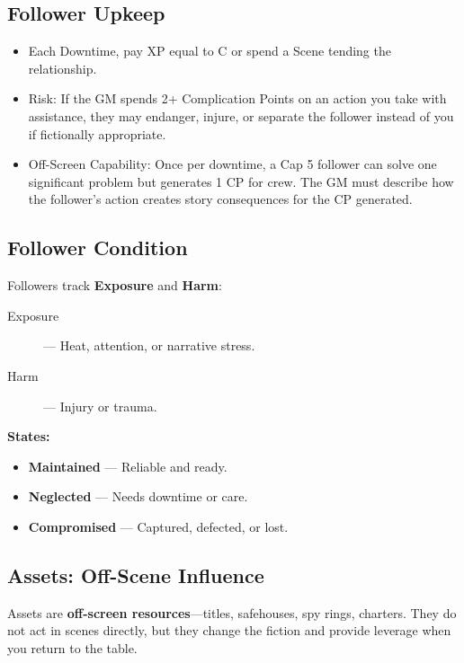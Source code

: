 \subsection*{Follower Upkeep}

\begin{itemize}
    \item Each Downtime, pay XP equal to C or spend a Scene tending the relationship.
    \item Risk: If the GM spends 2+ Complication Points on an action you take with assistance, they may endanger, injure, or separate the follower instead of you if fictionally appropriate.
    \item Off-Screen Capability: Once per downtime, a Cap 5 follower can solve one significant problem but generates 1 CP for crew. The GM must describe how the follower's action creates story consequences for the CP generated.
\end{itemize}

\subsection*{Follower Condition}

Followers track \textbf{Exposure} and \textbf{Harm}:

\begin{description}
    \item[Exposure] — Heat, attention, or narrative stress.
    \item[Harm] — Injury or trauma.
\end{description}

\textbf{States:}
\begin{itemize}
    \item \textbf{Maintained} — Reliable and ready.
    \item \textbf{Neglected} — Needs downtime or care.
    \item \textbf{Compromised} — Captured, defected, or lost.
\end{itemize}

\subsection*{Assets: Off-Scene Influence}

Assets are \textbf{off-screen resources}—titles, safehouses, spy rings, charters. They do not act in scenes directly, but they change the fiction and provide leverage when you return to the table.

